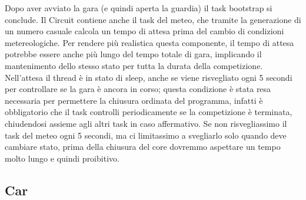 Dopo aver avviato la gara (e quindi aperta la guardia) il task bootstrap si conclude.
Il Circuit contiene anche il task del meteo, che tramite la generazione di un numero casuale calcola un tempo di attesa prima del cambio di condizioni metereologiche. Per rendere più realistica questa componente, il tempo di attesa potrebbe essere anche più lungo del tempo totale di gara, implicando il mantenimento dello stesso stato per tutta la durata della competizione. Nell’attesa il thread è in stato di sleep, anche se viene risvegliato ogni 5 secondi per controllare se la gara è ancora in corso; questa condizione è stata resa necessaria per permettere la chiusura ordinata del programma, infatti è obbligatorio che il task controlli periodicamente se la competizione è terminata, chiudendosi assieme agli altri task in caso affermativo. Se non risvegliassimo il task del meteo ogni 5 secondi, ma ci limitassimo a svegliarlo solo quando deve cambiare stato, prima della chiusura del core dovremmo aspettare un tempo molto lungo e quindi proibitivo.

\subsection{Car}


